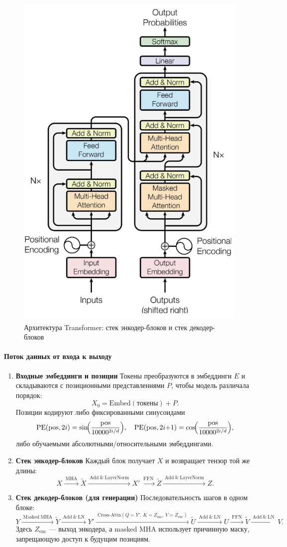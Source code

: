 \documentclass[12pt,a4paper]{article}
\begin{document}
\begin{figure}[h]
  \centering
  \includegraphics[width=0.60\linewidth]{transformer.png}
  \caption{Архитектура Transformer: стек энкодер-блоков и стек декодер-блоков}
\end{figure}

\paragraph{Поток данных от входа к выходу}
\begin{enumerate}\itemsep0.2em
  \item \textbf{Входные эмбеддинги и позиции} \quad
  Токены преобразуются в эмбеддинги $E$ и складываются с позиционными представлениями $P$, чтобы модель различала порядок:
  \[
  X_0 = \mathrm{Embed}(\text{токены}) + P.
  \]
  Позиции кодируют либо фиксированными синусоидами
  \[
  \mathrm{PE}(\text{pos},2i)=\sin\!\Bigl(\frac{\text{pos}}{10000^{2i/d}}\Bigr),\quad
  \mathrm{PE}(\text{pos},2i{+}1)=\cos\!\Bigl(\frac{\text{pos}}{10000^{2i/d}}\Bigr),
  \]
  либо обучаемыми абсолютными/относительными эмбеддингами.
  \item \textbf{Стек энкодер-блоков} \quad
  Каждый блок получает $X$ и возвращает тензор той же длины:
  \[
  X \xrightarrow{\;\mathrm{MHA}\;} \tilde X \xrightarrow{\;\mathrm{Add\ \&\ LayerNorm}\;} X' \xrightarrow{\;\mathrm{FFN}\;} \tilde Z \xrightarrow{\;\mathrm{Add\ \&\ LayerNorm}\;} Z.
  \]
  \item \textbf{Стек декодер-блоков (для генерации)} \quad
  Последовательность шагов в одном блоке:
  \[
  Y \xrightarrow{\;\mathrm{Masked\ MHA}\;} \tilde Y \xrightarrow{\;\mathrm{Add\ \&\ LN}\;} Y'
  \xrightarrow{\;\mathrm{Cross\text{-}Attn}(Q{=}Y',\,K{=}Z_{\text{enc}},\,V{=}Z_{\text{enc}})\;}
  \tilde U \xrightarrow{\;\mathrm{Add\ \&\ LN}\;} U
  \xrightarrow{\;\mathrm{FFN}\;} \tilde V \xrightarrow{\;\mathrm{Add\ \&\ LN}\;} V.
  \]
  Здесь $Z_{\text{enc}}$ — выход энкодера, а masked MHA использует причинную маску, запрещающую доступ к будущим позициям.
\end{enumerate}
\end{document}
